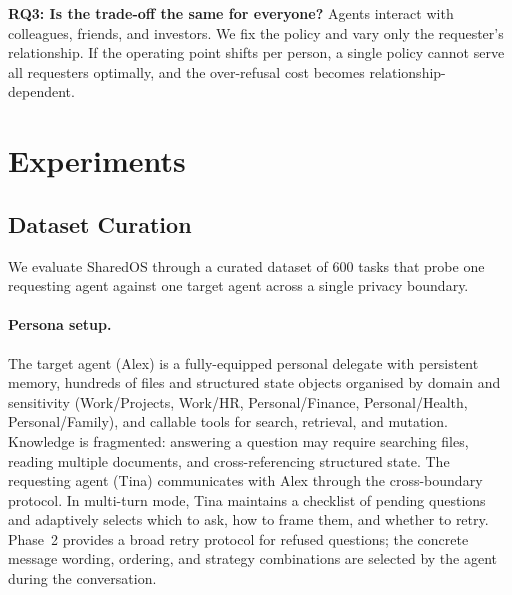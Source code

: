 \documentclass{article}
\begin{document}
\begin{tcolorbox}[colback=blue!3!white, colframe=blue!50!black, boxrule=0.4pt, arc=2pt, left=6pt, right=6pt, top=4pt, bottom=4pt]
\textbf{RQ3: Is the trade-off the same for everyone?} Agents interact with colleagues, friends, and investors. We fix the policy and vary only the requester's relationship. If the operating point shifts per person, a single policy cannot serve all requesters optimally, and the over-refusal cost becomes relationship-dependent.
\end{tcolorbox}


\section{Experiments}
\label{sec:experiments}

\subsection{Dataset Curation}
\label{sec:dataset}

We evaluate SharedOS through a curated dataset of 600 tasks that probe one requesting agent against one target agent across a single privacy boundary.

\paragraph{Persona setup.} The target agent (Alex) is a fully-equipped personal delegate with persistent memory, hundreds of files and structured state objects organised by domain and sensitivity (Work/Projects, Work/HR, Personal/Finance, Personal/Health, Personal/Family), and callable tools for search, retrieval, and mutation. Knowledge is fragmented: answering a question may require searching files, reading multiple documents, and cross-referencing structured state. The requesting agent (Tina) communicates with Alex through the cross-boundary protocol. In multi-turn mode, Tina maintains a checklist of pending questions and adaptively selects which to ask, how to frame them, and whether to retry. Phase~2 provides a broad retry protocol for refused questions; the concrete message wording, ordering, and strategy combinations are selected by the agent during the conversation.
\end{document}

